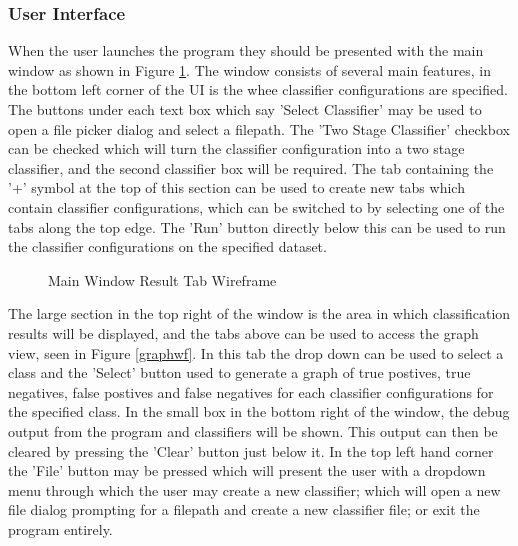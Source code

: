 \documentclass[12pt,a4paper]{article}
\begin{document}
\subsubsection{User Interface} \label{ui}
When the user launches the program they should be presented with the main window as shown in Figure \ref{mainwf}. The window consists of several main features, in the bottom left corner of the UI is the whee classifier configurations are specified. The buttons under each text box which say 'Select Classifier' may be used to open a file picker dialog and select a filepath. The 'Two Stage Classifier' checkbox can be checked which will turn the classifier configuration into a two stage classifier, and the second classifier box will be required. The tab containing the '+' symbol at the top of this section can be used to create new tabs which contain classifier configurations, which can be switched to by selecting one of the tabs along the top edge. The 'Run' button directly below this can be used to run the classifier configurations on the specified dataset.

\begin{figure}[H]
\caption{Main Window Result Tab Wireframe}
\label{mainwf}
\end{figure}
The large section in the top right of the window is the area in which classification results will be displayed, and the tabs above can be used to access the graph view, seen in Figure \ref{graphwf}. In this tab the drop down can be used to select a class and the 'Select' button used to generate a graph of true postives, true negatives, false postives and false negatives for each classifier configurations for the specified class. In the small box in the bottom right of the window, the debug output from the program and classifiers will be shown. This output can then be cleared by pressing the 'Clear' button just below it. In the top left hand corner the 'File' button may be pressed which will present the user with a dropdown menu through which the user may create a new classifier; which will open a new file dialog prompting for a filepath and create a new classifier file; or exit the program entirely.
\end{document}
